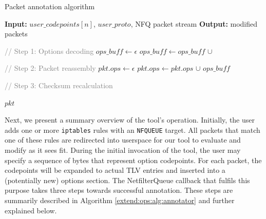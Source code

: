 \begin{algorithm}[h]
    \caption{Packet annotation algorithm}
    \label{extend:ops:alg:annotator}
    \begin{algorithmic}[1]
        \State \textbf{Input:} $user\_codepoints[n]$, $user\_proto$, NFQ packet stream
        \State \textbf{Output:} modified packets
        \item[]

                \State {}
            \EndIf
            \item[]

            \State \textcolor{gray}{// Step 1: Options decoding}
            \State $ops\_buff \gets \epsilon$
                \State $ops\_buff \gets ops\_buff$ $\cup$ 
            \EndFor
            \item[]

            \State \textcolor{gray}{// Step 2: Packet reassembly}
                \State $pkt.ops \gets \epsilon$
            \EndIf
            \State $pkt.ops \gets pkt.ops$ $\cup$ $ops\_buff$
            \State {}
            \item[]

            \State \textcolor{gray}{// Step 3: Checksum recalculation}
            \State {}
            \item[]

            \State \Return $pkt$
        \EndFunction
    \end{algorithmic}
\end{algorithm}

Next, we present a summary overview of the tool's operation. Initially, the user adds one or more \texttt{iptables} rules with an \texttt{NFQUEUE} target. All packets that match one of these rules are redirected into userspace for our tool to evaluate and modify as it sees fit. During the initial invocation of the tool, the user may specify a sequence of bytes that represent option codepoints. For each packet, the codepoints will be expanded to actual TLV entries and inserted into a (potentially new) options section. The NetfilterQueue callback that fulfils this purpose takes three steps towards successful annotation. These steps are summarily described in Algorithm \ref{extend:ops:alg:annotator} and further explained below.

